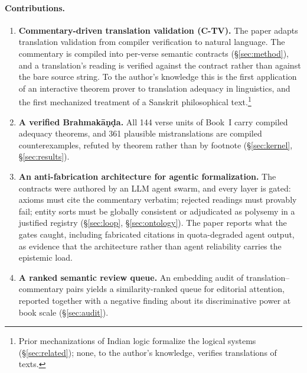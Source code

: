 \documentclass[11pt]{article}
\begin{document}
\paragraph{Contributions.}
\begin{enumerate}
  \item \textbf{Commentary-driven translation validation (C-TV).} The paper
    adapts translation validation from compiler verification
    \citep{pnueli1998translation, leroy2009compcert, tristan2008validators}
    to natural language. The commentary is compiled into per-verse semantic
    contracts (\S\ref{sec:method}), and a translation's reading is verified
    against the contract rather than against the bare source string. To the
    author's knowledge this is the first application of an interactive
    theorem prover to translation adequacy in linguistics, and the first
    mechanized treatment of a Sanskrit philosophical
    text.\footnote{Prior mechanizations of Indian logic formalize the logical
    systems (\S\ref{sec:related}); none, to the author's knowledge, verifies
    translations of texts.}
  \item \textbf{A verified Brahmak\={a}\d{n}\d{d}a.} All 144 verse units of
    Book~I carry compiled adequacy theorems, and 361 plausible
    mistranslations are compiled counterexamples, refuted by theorem rather
    than by footnote (\S\ref{sec:kernel}, \S\ref{sec:results}).
  \item \textbf{An anti-fabrication architecture for agentic formalization.}
    The contracts were authored by an LLM agent swarm, and every layer is
    gated: axioms must cite the commentary verbatim; rejected readings must
    provably fail; entity sorts must be globally consistent or adjudicated as
    polysemy in a justified registry (\S\ref{sec:loop},
    \S\ref{sec:ontology}). The paper reports what the gates caught, including
    fabricated citations in quota-degraded agent output, as evidence that the
    architecture rather than agent reliability carries the epistemic load.
  \item \textbf{A ranked semantic review queue.} An embedding audit of
    translation--commentary pairs yields a similarity-ranked queue for
    editorial attention, reported together with a negative finding about its
    discriminative power at book scale (\S\ref{sec:audit}).
\end{enumerate}
\end{document}
